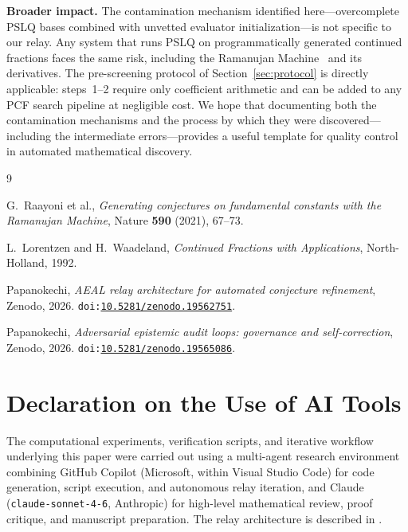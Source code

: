 \documentclass[11pt]{amsart}
\theoremstyle{definition}
\theoremstyle{remark}
\begin{document}
\textbf{Broader impact.}
The contamination mechanism identified here---overcomplete PSLQ bases
combined with unvetted evaluator initialization---is not specific to
our relay.
Any system that runs PSLQ on programmatically generated continued
fractions faces the same risk, including the Ramanujan
Machine~\cite{raayoni2021} and its derivatives.
The pre-screening protocol of Section~\ref{sec:protocol} is directly
applicable: steps~1--2 require only coefficient arithmetic and can
be added to any PCF search pipeline at negligible cost.
We hope that documenting both the contamination mechanisms and the
process by which they were discovered---including the intermediate
errors---provides a useful template for quality control in
automated mathematical discovery.

\begin{thebibliography}{9}

G.~Raayoni et al.,
\emph{Generating conjectures on fundamental constants with the
  Ramanujan Machine},
Nature \textbf{590} (2021), 67--73.

L.~Lorentzen and H.~Waadeland,
\emph{Continued Fractions with Applications},
North-Holland, 1992.

Papanokechi,
\emph{AEAL relay architecture for automated conjecture refinement},
Zenodo, 2026.
\texttt{doi:\href{https://doi.org/10.5281/zenodo.19562751}{10.5281/zenodo.19562751}}.

Papanokechi,
\emph{Adversarial epistemic audit loops: governance and self-correction},
Zenodo, 2026.
\texttt{doi:\href{https://doi.org/10.5281/zenodo.19565086}{10.5281/zenodo.19565086}}.

\end{thebibliography}

\section*{Declaration on the Use of AI Tools}

The computational experiments, verification scripts,
and iterative workflow underlying this paper were
carried out using a multi-agent research environment
combining GitHub Copilot (Microsoft, within Visual
Studio Code) for code generation, script execution,
and autonomous relay iteration, and Claude
(\texttt{claude-sonnet-4-6}, Anthropic) for
high-level mathematical review, proof critique,
and manuscript preparation. The relay architecture
is described in \cite{aeal-paper7,aeal-paper8}.
\end{document}
